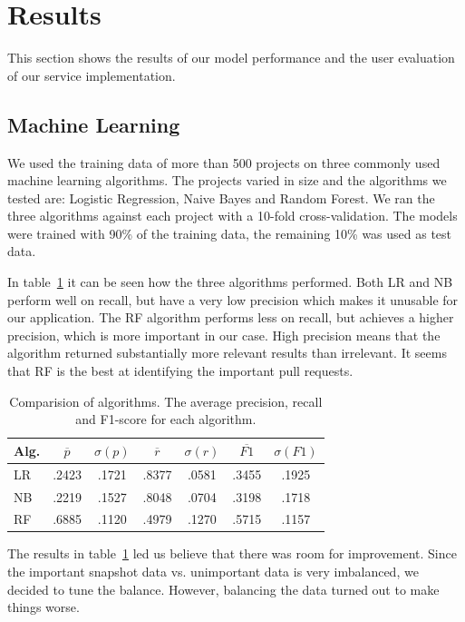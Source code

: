 \section{Results}
\label{sec:results}

This section shows the results of our model performance and the user evaluation of our service implementation.

\subsection{Machine Learning}
\label{sec:learning}

We used the training data of more than 500 projects on three commonly used machine learning algorithms.
The projects varied in size and the algorithms we tested are: Logistic Regression, Naive Bayes and Random Forest.
We ran the three algorithms against each project with a 10-fold cross-validation.
The models were trained with 90\% of the training data, the remaining 10\% was used as test data.

In table~\ref{tab:alg-compare} it can be seen how the three algorithms performed.
Both LR and NB perform well on recall, but have a very low precision which makes it unusable for our application.
The RF algorithm performs less on recall, but achieves a higher precision, which is more important in our case.
High precision means that the algorithm returned substantially more relevant results than irrelevant.
It seems that RF is the best at identifying the important pull requests.

\begin{table}
  \begin{tabular}{ l | c | c | c | c | c | c }
    Alg. & $\overline{p}$ & $\sigma(p)$ & $\overline{r}$ & $\sigma(r)$ & $\overline{F1}$ & $\sigma(F1)$ \\ \hline
    \hline
    LR & .2423 & .1721 & .8377 & .0581 & .3455 & .1925 \\ \hline
    NB & .2219 & .1527 & .8048 & .0704 & .3198 & .1718 \\ \hline
    RF & .6885 & .1120 & .4979 & .1270 & .5715 & .1157 \\
  \end{tabular}
  \caption[Comparision of algorithms]{Comparision of algorithms. The average precision, recall and F1-score for each algorithm. }
  \label{tab:alg-compare}
\end{table}

The results in table~\ref{tab:alg-compare} led us believe that there was room for improvement.
Since the important snapshot data vs. unimportant data is very imbalanced, we decided to tune the balance.
However, balancing the data turned out to make things worse.

